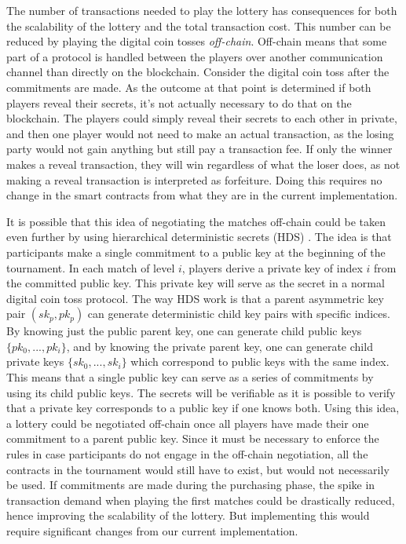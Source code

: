 The number of transactions needed to play the lottery has consequences for both the scalability of the lottery and the total transaction cost. This number can be reduced by playing the digital coin tosses \emph{off-chain}. Off-chain means that some part of a protocol is handled between the players over another communication channel than directly on the blockchain. Consider the digital coin toss after the commitments are made. As the outcome at that point is determined if both players reveal their secrets, it's not actually necessary to do that on the blockchain. The players could simply reveal their secrets to each other in private, and then one player would not need to make an actual transaction, as the losing party would not gain anything but still pay a transaction fee. If only the winner makes a reveal transaction, they will win regardless of what the loser does, as not making a reveal transaction is interpreted as forfeiture. Doing this requires no change in the smart contracts from what they are in the current implementation.

It is possible that this idea of negotiating the matches off-chain could be taken even further by using hierarchical deterministic secrets (HDS) \cite{wuille_bitcoin_2012}. The idea is that participants make a single commitment to a public key at the beginning of the tournament. In each match of level $i$, players derive a private key of index $i$ from the committed public key. This private key will serve as the secret in a normal digital coin toss protocol. The way HDS work is that a parent asymmetric key pair $(sk_p, pk_p)$ can generate deterministic child key pairs with specific indices. By knowing just the public parent key, one can generate child public keys $\{pk_0, ..., pk_i\}$, and by knowing the private parent key, one can generate child private keys $\{sk_0, ..., sk_i\}$ which correspond to public keys with the same index. This means that a single public key can serve as a series of commitments by using its child public keys. The secrets will be verifiable as it is possible to verify that a private key corresponds to a public key if one knows both. Using this idea, a lottery could be negotiated off-chain once all players have made their one commitment to a parent public key. Since it must be necessary to enforce the rules in case participants do not engage in the off-chain negotiation, all the contracts in the tournament would still have to exist, but would not necessarily be used. If commitments are made during the purchasing phase, the spike in transaction demand when playing the first matches could be drastically reduced, hence improving the scalability of the lottery. But implementing this would require significant changes from our current implementation.

